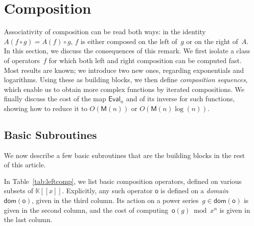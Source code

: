 \documentclass{sig-alternate}
\def\K {\ensuremath{\mathbb{K}}}
\def\M{\ensuremath{\mathsf{M}}}
\def\o {\ensuremath{\mathsf{o}}}
\def\dom {\ensuremath{\mathsf{dom}}}
\def\Eval {\ensuremath{\mathsf{Eval}}}
\begin{document}
\section{Composition}\label{sec:compose}
Associativity of composition can be read both ways: in the identity
$A(f\circ g)=A(f)\circ g$, $f$ is either composed on the left of~$g$
or on the right of~$A$.  In this section, we discuss the consequences
of this remark.  We first isolate a class of operators~$f$ for which
both left and right composition can be computed fast. Most results are
known; we introduce two new ones, regarding exponentials and logarithms.
Using these as building blocks, we then define \emph{composition
sequences}, which enable us to obtain more complex functions by
iterated compositions. We finally discuss the cost of the map
$\Eval_{n}$ and of its inverse for such functions, showing how to
reduce it to $O(\M(n))$ or $O(\M(n)\log(n))$.



\subsection{Basic Subroutines}\label{ssec:basic}
We now describe a few basic subroutines that are the building
blocks in the rest of this article.
   
\smallskip{}  In
Table~\ref{tab:leftcomp}, we list basic composition operators,
defined on various subsets of $\K[[x]]$.
Explicitly, any such operator $\o$ is defined on a \emph{domain}
$\dom(\o)$, given in the third column. Its action on a power
series~$g\in\dom(\o)$ is given in the second column, and the cost of
computing~$\o(g)\bmod x^n$ is given in the last column. 
\end{document}
